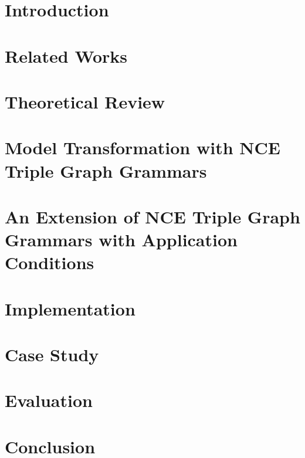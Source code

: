\documentclass[side,12pt,oz,a4,fancybox,fancyheadings,fleqnb,openany]{book}
\begin{document}
\parindent=0in
\parskip=5pt
\setcounter{secnumdepth}{5}
\setcounter{tocdepth}{2}



\cleardoublepage


\cleardoublepage

\setcounter{page}{5}




{
\tableofcontents
\listoffigures
\listoftables

}

\chapter{Introduction}
\label{ch:Introduction}


\chapter{Related Works}
\label{ch:RelatedWorks}


\chapter{Theoretical Review}
\label{ch:TheoreticalReview}


\chapter{Model Transformation with NCE Triple Graph Grammars}
\label{ch:ModelTransformation}


\chapter{An Extension of NCE Triple Graph Grammars with Application Conditions}
\label{ch:PacExtension}


\chapter{Implementation}
\label{ch:Implementation}


\chapter{Case Study}
\label{ch:CaseStudy}


\chapter{Evaluation}
\label{ch:Evaluation}


\chapter{Conclusion}
\label{ch:Conclusion}




\end{document}
